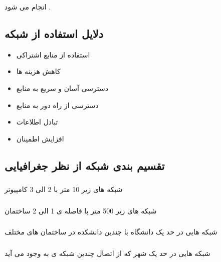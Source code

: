 \documentclass[12pt]{book}
\begin{document}
انجام می شود .


\subsection{دلایل استفاده از شبکه}

\begin{itemize}
	\item استفاده از منابع اشتراکی
	\item کاهش هزینه ها
	\item دسترسی آسان و سریع به منابع
	\item دسترسی از راه دور به منابع
	\item تبادل اطلاعات
	\item افزایش اطمینان
\end{itemize}


\subsection{تقسیم بندی شبکه از نظر جغرافیایی}


\subsubsection{}

شبکه های زیر 10 متر با 2 الی 3 کامپیوتر

\subsubsection{}

شبکه های زیر 500 متر با فاصله ی 1 الی 2 ساختمان

\subsubsection{}

شبکه هایی در حد یک دانشگاه با چندین دانشکده در ساختمان های مختلف

\subsubsection{}

شبکه هایی در حد یک شهر که از اتصال چندین شبکه ی 
به وجود می آید

\subsubsection{}
\end{document}

